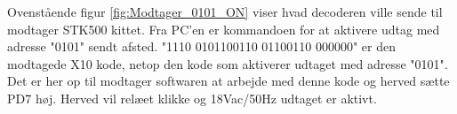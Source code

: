 Ovenstående figur \ref{fig:Modtager_0101_ON} viser hvad decoderen ville sende til modtager STK500 kittet. Fra PC'en er kommandoen for at aktivere udtag med adresse "0101" sendt afsted.
"1110 0101100110 01100110 000000" er den modtagede X10 kode, netop den kode som aktiverer udtaget med adresse "0101". Det er her op til modtager softwaren at arbejde med denne kode og herved sætte PD7 høj. Herved vil relæet klikke og 18Vac/50Hz udtaget er aktivt. 